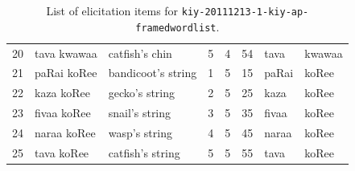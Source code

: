 \documentclass[12pt]{article}
\begin{document}
\begin{table}
\begin{tabular}{llllllll}
    20   & tava kwawaa  & catfish's chin     & 5     & 4     & 54    & tava  & kwawaa \\
    21   & paRai koRee  & bandicoot's string & 1     & 5     & 15    & paRai & koRee  \\
    22   & kaza koRee   & gecko's string     & 2     & 5     & 25    & kaza  & koRee  \\
    23   & fivaa koRee  & snail's string     & 3     & 5     & 35    & fivaa & koRee  \\
    24   & naraa koRee  & wasp's string      & 4     & 5     & 45    & naraa & koRee  \\
    25   & tava koRee   & catfish's string   & 5     & 5     & 55    & tava  & koRee  \\
    \end{tabular}
\label{tab:kiy-20111213}
\caption{List of elicitation items for \texttt{kiy-20111213-1-kiy-ap-framedwordlist}.}
\end{table}
\end{document}
